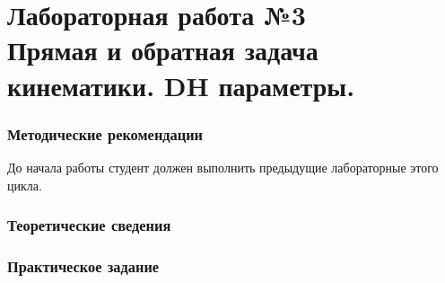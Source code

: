 \documentclass[12pt,a4paper,openany]{extarticle}
\begin{document}
\part*{Лабораторная работа №3\\ Прямая и обратная задача кинематики. DH параметры.}
\section{Методические рекомендации}
\hspace*{\parindent}До начала работы студент должен выполнить предыдущие лабораторные этого цикла.

\section{Теоретические сведения}

 


\section{Практическое задание}


\end{document}
